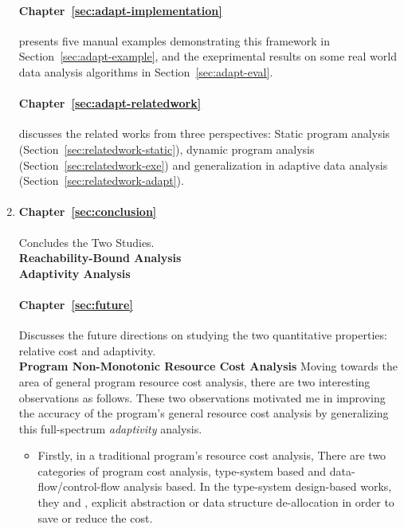 \begin{enumerate}
    \paragraph{Chapter~\ref{sec:adapt-implementation}} presents five manual examples demonstrating this framework in Section~\ref{sec:adapt-example},
    and the exeprimental results on some real world data analysis algorithms in Section~\ref{sec:adapt-eval}.
    
    \paragraph{Chapter~\ref{sec:adapt-relatedwork}} discusses the related works from three perspectives:
    Static program analysis (Section~\ref{sec:relatedwork-static}), dynamic program analysis (Section~\ref{sec:relatedwork-exe}) and generalization in adaptive data analysis (Section~\ref{sec:relatedwork-adapt}).  

    \item {}
    \paragraph*{Chapter~\ref{sec:conclusion}}
    Concludes the Two Studies.
    \\
    \textbf{Reachability-Bound Analysis}
    \\
    \textbf{Adaptivity Analysis}

    \paragraph*{Chapter~\ref{sec:future}}
    Discusses the future directions on studying the two quantitative properties: relative cost and adaptivity.
    \\
    \textbf{Program Non-Monotonic Resource Cost Analysis}
        Moving towards the area of general program resource cost analysis,
        there are two interesting observations as follows.
        These two observations motivated me in 
        improving the accuracy of the program's general resource cost analysis
        by generalizing this full-spectrum \emph{adaptivity} analysis.
        \begin{itemize}
        \item Firstly, in a traditional program's resource cost analysis,
        There are two categories of program cost analysis, type-system based and data-flow/control-flow analysis based. 
        In the type-system design-based works, they \cite{GustafssonEL05} and \cite{hoffmann_jost_2022}, explicit abstraction or data structure de-allocation in order to save or reduce the cost.
        

\end{itemize}
\end{enumerate}

